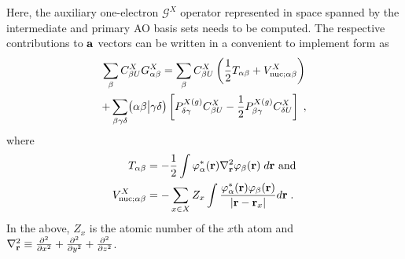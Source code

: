 %
Here, the auxiliary one\hyp{}electron ${\mathscr{G}}^X$ operator represented
in space spanned by the intermediate and primary AO basis sets
needs to be computed. The respective contributions to ${\bf a}$ vectors can be
written in a convenient to implement form as
%
\begin{multline}
 \sum_\beta C_{\beta U}^X G_{\alpha\beta}^X = 
 \sum_\beta C_{\beta U}^X \left( \frac{1}{2} T_{\alpha\beta}  + V_{{\rm nuc};\alpha\beta}^X \right)\\
   + \sum_{\beta\gamma\delta} \bigl( {\alpha\beta} \bigl\lvert {\gamma\delta} \bigr)
     \left[ P_{\delta\gamma}^{X(g)} C_{\beta U}^X - \frac{1}{2} P_{\beta\gamma}^{X(g)} C_{\delta U}^X \right] \;,
\end{multline}
%
where
%
\begin{subequations}
\begin{align}
 T_{\alpha\beta} &= -\frac{1}{2} \int \varphi^*_\alpha({\bf r}) \nabla^2_{{\bf r}} \varphi_\beta({\bf r})\; d{\bf r} 
 \text{ and}\\ 
 V_{{\rm nuc};\alpha\beta}^X &= -\sum_{x\in X} Z_x \int 
           \frac{\varphi^*_\alpha({\bf r})  \varphi_\beta({\bf r}) }{\vert {\bf r} - {\bf r}_x \vert} d{\bf r} \;.
\end{align}
\end{subequations}
%
In the above, $Z_x$ is the atomic number of the $x$th atom and $\nabla^2_{{\bf r}}\equiv 
\frac{\partial^2}{\partial x^2} + \frac{\partial^2}{\partial y^2} + \frac{\partial^2}{\partial z^2}$.



